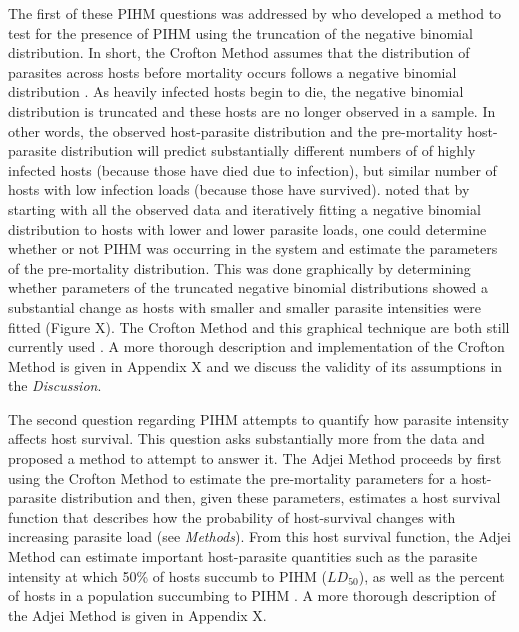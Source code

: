 \documentclass[12pt, a4paper]{article}
\begin{document}
The first of these PIHM questions was addressed by \cite{Crofton1971a} who developed
a method to test for the presence of PIHM using the truncation of the negative binomial
distribution.  In short, the Crofton Method assumes that the distribution of
parasites across hosts before mortality occurs follows a negative binomial
distribution \citep{AndersonandMay1978,Shaw1998}.  As heavily infected hosts
begin to die, the negative binomial distribution is truncated and these hosts are no longer observed in a sample. In other words, the
observed host-parasite distribution and the pre-mortality host-parasite
distribution will predict substantially different numbers of of highly infected
hosts (because those have died due to infection), but similar number of hosts with low infection
loads (because those have survived).  \cite{Crofton1971a} noted that by
starting with all the observed data and iteratively fitting a negative binomial
distribution to hosts with lower and lower parasite loads, one could determine
whether or not PIHM was occurring in the system and estimate the parameters of the pre-mortality distribution.  This was done
graphically by determining whether parameters of the truncated negative binomial distributions showed a substantial change as hosts with smaller and smaller parasite intensities were fitted (Figure X).  The Crofton Method and this graphical technique are both still currently used \citep{Ferguson2011}. A more thorough description and implementation of the Crofton Method is given in Appendix X and we discuss the validity of its assumptions in the \emph{Discussion}.

The second question regarding PIHM attempts to quantify how parasite intensity affects host survival.  This question asks substantially more from the data and \cite{Adjei1986} proposed a method to attempt to answer it.  The Adjei Method proceeds
by first using the Crofton Method to estimate the pre-mortality parameters for
a host-parasite distribution and then, given these
parameters, estimates a host survival function that describes how the
probability of host-survival changes with increasing parasite load (see
\emph{Methods}).  From this host survival function, the
Adjei Method can estimate important host-parasite quantities such as the
parasite intensity at which 50\% of hosts succumb to PIHM ($LD_{50}$), as well
as the percent of hosts in a population succumbing to PIHM \citep{Adjei1986}. A more thorough description of the Adjei Method is given in Appendix X.
\end{document}
